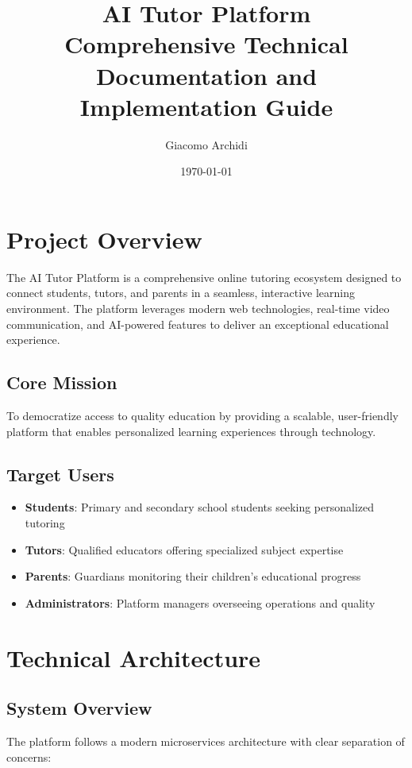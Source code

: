 \documentclass[11pt,a4paper]{article}
\title{\textbf{AI Tutor Platform}\\
\large Comprehensive Technical Documentation and Implementation Guide}
\author{Giacomo Archidi}
\date{\today}
\begin{document}
\maketitle
\tableofcontents
\newpage

\section{Project Overview}

The AI Tutor Platform is a comprehensive online tutoring ecosystem designed to connect students, tutors, and parents in a seamless, interactive learning environment. The platform leverages modern web technologies, real-time video communication, and AI-powered features to deliver an exceptional educational experience.

\subsection{Core Mission}
To democratize access to quality education by providing a scalable, user-friendly platform that enables personalized learning experiences through technology.

\subsection{Target Users}
\begin{itemize}
    \item \textbf{Students}: Primary and secondary school students seeking personalized tutoring
    \item \textbf{Tutors}: Qualified educators offering specialized subject expertise
    \item \textbf{Parents}: Guardians monitoring their children's educational progress
    \item \textbf{Administrators}: Platform managers overseeing operations and quality
\end{itemize}

\section{Technical Architecture}

\subsection{System Overview}
The platform follows a modern microservices architecture with clear separation of concerns:
\end{document}
